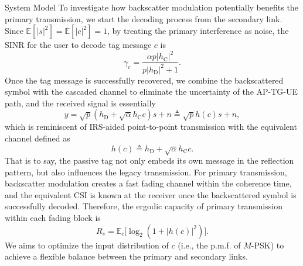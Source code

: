 \documentclass[journal]{IEEEtran}
\newtheorem{remark}{Remark}
\begin{document}
\begin{section}{System Model}
		To investigate how backscatter modulation potentially benefits the primary transmission, we start the decoding process from the secondary link. Since $\mathbb{E}[\lvert s \rvert^2] = \mathbb{E}[\lvert c \rvert^2] = 1$, by treating the primary interference as noise, the SINR for the user to decode tag message $c$ is
		\begin{equation}
			\gamma_c = \frac{\alpha p \lvert h_{\mathrm{C}} \rvert^2}{p \lvert h_{\mathrm{D}} \rvert^2 + 1}.
		\end{equation}
		Once the tag message is successfully recovered, we combine the backscattered symbol with the cascaded channel to eliminate the uncertainty of the AP-TG-UE path, and the received signal is essentially
		\begin{equation}
			y = \sqrt{p} (h_{\mathrm{D}} + \sqrt{\alpha} h_{\mathrm{C}} c) s + n \triangleq \sqrt{p} h(c) s + n,
		\end{equation}
		which is reminiscent of IRS-aided point-to-point transmission with the equivalent channel defined as
		\begin{equation}
			h(c) \triangleq h_{\mathrm{D}} + \sqrt{\alpha} h_{\mathrm{C}} c.
		\end{equation}
		That is to say, the passive tag not only embeds its own message in the reflection pattern, but also influences the legacy transmission. For primary transmission, backscatter modulation creates a fast fading channel within the coherence time, and the equivalent CSI is known at the receiver once the backscattered symbol is successfully decoded. Therefore, the ergodic capacity of primary transmission within each fading block is \cite{Tse2005}
		\begin{equation}
			R_s = \mathbb{E}_c \bigl[ \log_2 ( 1 + \lvert h(c) \rvert^2 ) \bigr].
		\end{equation}
		We aims to optimize the input distribution of $c$ (i.e., the p.m.f. of $M$-PSK) to achieve a flexible balance between the primary and secondary links.




\end{section}
\end{document}
